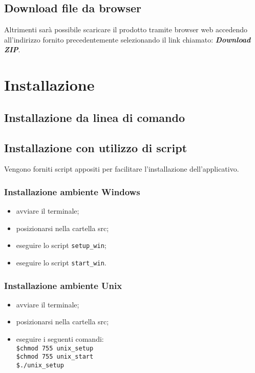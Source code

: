 \documentclass[12pt,a4paper]{article}
\begin{document}
	\subsection{Download file da browser}
	Altrimenti sarà possibile scaricare il prodotto tramite browser web accedendo
	all’indirizzo fornito precedentemente selezionando il link chiamato: \textbf{\textit{Download ZIP}}.
	
	\newpage
	\section{Installazione}\label{install}
	\subsection{Installazione da linea di comando}
	\TODO{}
	\subsection{Installazione con utilizzo di script}
	Vengono forniti script appositi per facilitare l'installazione dell'applicativo. 
	
		\subsubsection{Installazione ambiente Windows}
		\begin{itemize}
			\item avviare il terminale;
			\item posizionarsi nella cartella src;
			\item eseguire lo script \texttt{setup\_win};
			\item eseguire lo script \texttt{start\_win}.	
		\end{itemize}	
	
		\subsubsection{Installazione ambiente Unix}
		\begin{itemize}
			\item avviare il terminale;
			\item posizionarsi nella cartella src;
			\item eseguire i seguenti comandi:\\
			\texttt{\$chmod 755 unix\_setup \\
			\$chmod 755 unix\_start	 \\
			\$./unix\_setup }
		\end{itemize}
\end{document}
